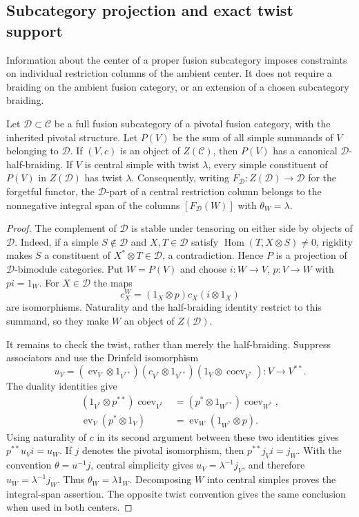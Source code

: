 \subsection{Subcategory projection and exact twist support}
\label{sec:subcategory-projection}

Information about the center of a proper fusion subcategory imposes constraints
on individual restriction columns of the ambient center. It does not require
a braiding on the ambient fusion category, or an extension of a chosen
subcategory braiding.

\begin{proposition}\label{prop:central-subcategory-projection}
Let $\mathcal D\subset\mathcal C$ be a full fusion subcategory of a pivotal
fusion category, with the inherited pivotal structure. Let $P(V)$ be the sum
of all simple summands of $V$ belonging to $\mathcal D$.
If $(V,c)$ is an object of $Z(\mathcal C)$, then $P(V)$ has a canonical
$\mathcal D$-half-braiding. If $V$ is central simple with twist $\lambda$,
every simple constituent of $P(V)$ in $Z(\mathcal D)$ has twist $\lambda$.
Consequently, writing $F_{\mathcal D}:Z(\mathcal D)\to\mathcal D$ for the
forgetful functor, the $\mathcal D$-part of a central restriction column
belongs to the nonnegative integral span of the columns
$[F_{\mathcal D}(W)]$ with $\theta_W=\lambda$.
\end{proposition}
\begin{proof}
The complement of $\mathcal D$ is stable under tensoring on either side by
objects of $\mathcal D$. Indeed, if a simple $S\notin\mathcal D$ and
$X,T\in\mathcal D$ satisfy $\operatorname{Hom}(T,X\otimes S)\ne0$,
rigidity makes $S$ a constituent of $X^*\otimes T\in\mathcal D$, a
contradiction. Hence $P$ is a projection of $\mathcal D$-bimodule categories.
Put $W=P(V)$ and choose $i:W\to V$, $p:V\to W$ with $pi=1_W$.
For $X\in\mathcal D$ the maps
\[
 c^W_X=(1_X\otimes p)c_X(i\otimes1_X)
\]
are isomorphisms. Naturality and the half-braiding identity restrict to this
summand, so they make $W$ an object of $Z(\mathcal D)$.

It remains to check the twist, rather than merely the half-braiding.
Suppress associators and use the Drinfeld isomorphism
\[
 u_V=(\operatorname{ev}_V\otimes1_{V^{**}})
       (c_{V^*}\otimes1_{V^{**}})
       (1_V\otimes\operatorname{coev}_{V^*}):V\longrightarrow V^{**}.
\]
The duality identities give
\[
 \begin{split}
 (1_{V^*}\otimes p^{**})\operatorname{coev}_{V^*}
   &=(p^*\otimes1_{W^{**}})\operatorname{coev}_{W^*},\\
 \operatorname{ev}_V(p^*\otimes1_V)
   &=\operatorname{ev}_W(1_{W^*}\otimes p).
 \end{split}
\]
Using naturality of $c$ in its second argument between these two identities
gives $p^{**}u_Vi=u_W$. If $j$ denotes the pivotal isomorphism, then
$p^{**}j_Vi=j_W$. With the convention $\theta=u^{-1}j$, central simplicity
gives $u_V=\lambda^{-1}j_V$, and therefore
$u_W=\lambda^{-1}j_W$. Thus $\theta_W=\lambda1_W$.
Decomposing $W$ into central simples proves the integral-span assertion.
The opposite twist convention gives the same conclusion when used in both
centers.
\end{proof}


